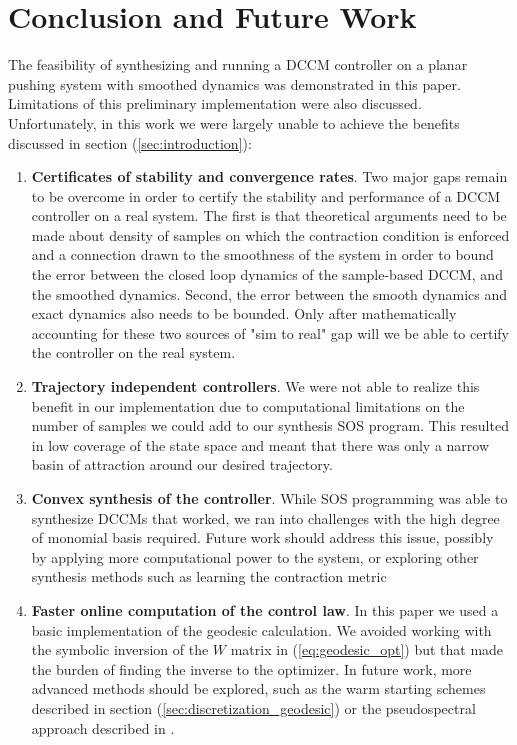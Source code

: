 \documentclass[journal]{IEEEtran}
\begin{document}
\section{Conclusion and Future Work}
The feasibility of synthesizing and running a DCCM controller on a planar pushing system with smoothed dynamics was demonstrated in this paper. Limitations of this preliminary implementation were also discussed. Unfortunately, in this work we were largely unable to achieve the benefits discussed in section (\ref{sec:introduction}):
\begin{enumerate}
	\item {\bf Certificates of stability and convergence rates}. Two major gaps remain to be overcome in order to certify the stability and performance of a DCCM controller on a real system. The first is that theoretical arguments need to be made about density of samples on which the contraction condition is enforced and a connection drawn to the smoothness of the system in order to bound the error between the closed loop dynamics of the sample-based DCCM, and the smoothed dynamics. Second, the error between the smooth dynamics and exact dynamics also needs to be bounded. Only after mathematically accounting for these two sources of "sim to real" gap will we be able to certify the controller on the real system.
	\item {\bf Trajectory independent controllers}. We were not able to realize this benefit in our implementation due to computational limitations on the number of samples we could add to our synthesis SOS program. This resulted in low coverage of the state space and meant that there was only a narrow basin of attraction around our desired trajectory.
	\item {\bf Convex synthesis of the controller}. While SOS programming was able to synthesize DCCMs that worked, we ran into challenges with the high degree of monomial basis required. Future work should address this issue, possibly by applying more computational power to the system, or exploring other synthesis methods such as learning the contraction metric \autocite{singhLearningStabilizableDynamical2018,chouModelErrorPropagation2021}
	\item {\bf Faster online computation of the control law}. In this paper we used a basic implementation of the geodesic calculation. We avoided working with the symbolic inversion of the $W$ matrix in (\ref{eq:geodesic_opt}) but that made the burden of finding the inverse to the optimizer. In future work, more advanced methods should be explored, such as the warm starting schemes described in section (\ref{sec:discretization_geodesic}) or the pseudospectral approach described in \autocite{leungNonlinearStabilizationControl2017}.
\end{enumerate}
\end{document}
